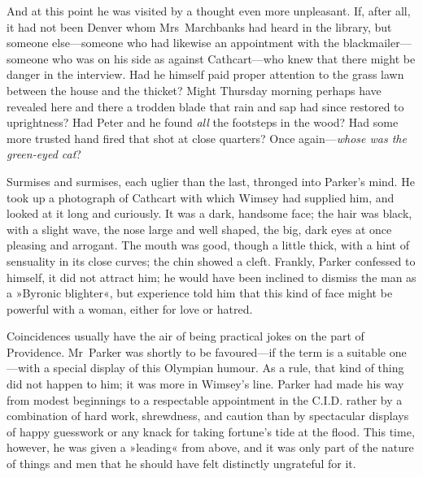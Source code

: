 And at this point he was visited by a thought even more unpleasant. If, after all, it had not been Denver whom Mrs~Marchbanks had heard in the library, but someone else—someone who had likewise an appointment with the blackmailer—someone who was on his side as against Cathcart—who knew that there might be danger in the interview. Had he himself paid proper attention to the grass lawn between the house and the thicket?  Might Thursday morning perhaps have revealed here and there a trodden blade that rain and sap had since restored to uprightness? Had Peter and he found \textit{all} the footsteps in the wood? Had some more trusted hand fired that shot at close quarters? Once again—\textit{whose was the green-eyed cat}?

Surmises and surmises, each uglier than the last, thronged into Parker's mind. He took up a photograph of Cathcart with which Wimsey had supplied him, and looked at it long and curiously. It was a dark, handsome face; the hair was black, with a slight wave, the nose large and well shaped, the big, dark eyes at once pleasing and arrogant. The mouth was good, though a little thick, with a hint of sensuality in its close curves; the chin showed a cleft. Frankly, Parker confessed to himself, it did not attract him; he would have been inclined to dismiss the man as a »Byronic blighter«, but experience told him that this kind of face might be powerful with a woman, either for love or hatred.

Coincidences usually have the air of being practical jokes on the part of Providence. Mr~Parker was shortly to be favoured—if the term is a suitable one—with a special display of this Olympian humour. As a rule, that kind of thing did not happen to him; it was more in Wimsey's line. Parker had made his way from modest beginnings to a respectable appointment in the C.I.D. rather by a combination of hard work, shrewdness, and caution than by spectacular displays of happy guesswork or any knack for taking fortune's tide at the flood. This time, however, he was given a »leading« from above, and it was only part of the nature of things and men that he should have felt distinctly ungrateful for it.

